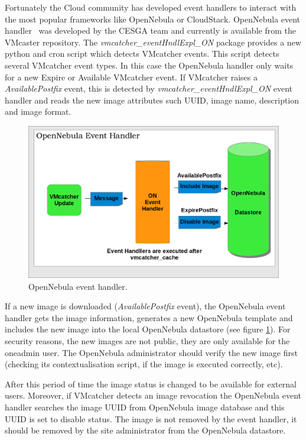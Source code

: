 \documentclass{cai}
\begin{document}
Fortunately the Cloud community has developed event handlers to interact with the most popular frameworks like OpenNebula or CloudStack.
OpenNebula event handler~\cite{onevent} was developed by the CESGA team and currently is available from the VMcaster repository. 
The \textit{vmcatcher\_eventHndlExpl\_ON} package provides a new python and cron script which detects VMcatcher events. 
This script detects several VMcatcher event types. In this case the OpenNebula handler only waits for a new Expire or Available VMcatcher event.
If VMcatcher raises a \textit{AvailablePostfix} event, this is detected by \textit{vmcatcher\_eventHndlExpl\_ON} event handler and reads the new image attributes such UUID, image name, description and image format.

\begin{figure}
\centering
\includegraphics[width=1\textwidth]{ONeventhandler.png}
\caption{OpenNebula event handler.}
\label{fig:onevent}
\end{figure}

If a new image is downloaded (\textit{AvailablePostfix} event), the OpenNebula event handler gets the image information, generates a new OpenNebula template and includes the new image into the local OpenNebula datastore (see figure \ref{fig:onevent}). 
For security reasons, the new images are not public, they are only available for the oneadmin user. The OpenNebula administrator should verify the new image first (checking its contextualisation script, if the image is executed correctly, etc).

After this period of time the image status is changed to be available for external users. 
Moreover, if VMcatcher detects an image revocation the OpenNebula event handler searches the image UUID from OpenNebula image database and this UUID is set to disable status.
The image is not removed by the event handler, it should be removed by the site administrator from the OpenNebula datastore.
\end{document}

